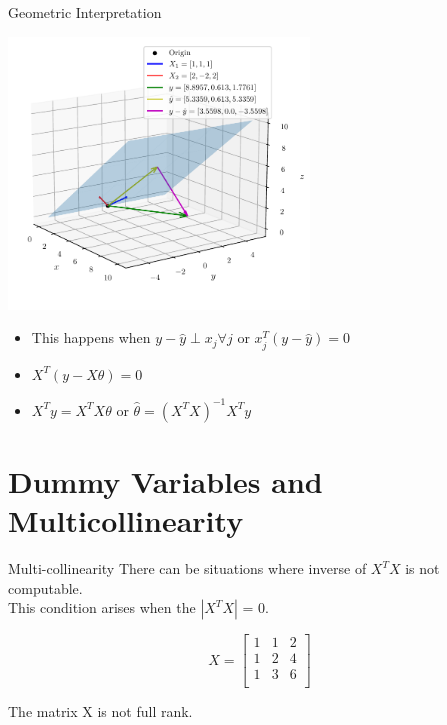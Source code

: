 \documentclass{beamer}
\begin{document}
\begin{frame}{Geometric Interpretation}	

    \includegraphics[width=0.6\textwidth]{../assets/linear-regression/figures/geometric-4.pdf}

    


\begin{itemize}[<+->]
\item This happens when $y-\hat{y}\perp x_j \forall j$ or $x_j^T(y-\hat{y})=0$
\item $X^T(y-X\theta)=0$
\item $X^Ty = X^TX\theta$ or $\hat{\theta} =(X^TX)^{-1}X^Ty$ 
\end{itemize}

\end{frame}

\section{Dummy Variables and Multicollinearity}
\begin{frame}{Multi-collinearity}
    There can be situations where inverse of $X^{T}X$ is not computable. \\
    \pause This condition arises when the $|X^{T}X|$ = 0.
    
    \begin{equation}
    X = \begin{bmatrix}
    1 & 1& 2\\
    1 & 2& 4\\
    1 & 3& 6\\
    \end{bmatrix}
    \end{equation}
    
    \pause The matrix X is not full rank. 
    \end{frame}
    
\end{document}

